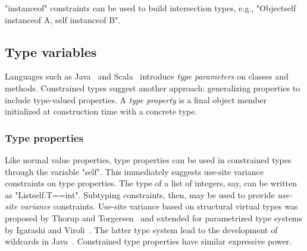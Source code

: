 \xcd"instanceof" constraints can be used to build intersection
types, e.g., \xcd"Object{self instanceof A, self instanceof B}".

\subsection{Type variables}
\label{sec:type-properties}
\label{sec:variance}

Languages such as Java~\cite{Java3} and
Scala~\cite{scala} introduce \emph{type parameters} on classes
and methods.
Constrained types suggest another approach:
generalizing properties to include type-valued properties.
A \emph{type property}
is a final object member initialized at construction time with a
concrete type.  

\subsubsection{Type properties}

\label{sec:usability}
\label{sec:parameters-vs-fields}

Like normal value properties, type properties
can be used in constrained types through the variable \xcd"self".
%
This immediately suggests use-site variance constraints on type
properties.
The type of a list of integers, say, can be written as
\xcd"List{self.T==int}".  
Subtyping constraints, then, may be used to
provide \emph{use-site variance} constraints.
Use-site variance based on structural virtual types was proposed by
Thorup and Torgersen~\cite{unifying-genericity} and extended for
parametrized type systems by Igarashi and
Viroli~\cite{variant-parametric-types}.  The latter type system lead
to the development of wildcards in
Java~\cite{Java3,adding-wildcards,wildcards-safe}.  Constrained
type properties
have similar expressive power.

